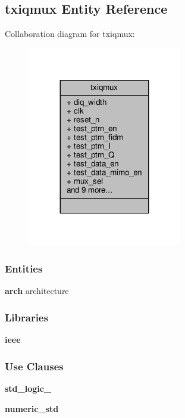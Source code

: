 \subsection{txiqmux Entity Reference}
\label{classtxiqmux}


Collaboration diagram for txiqmux\+:\nopagebreak
\begin{figure}[H]
\begin{center}
\leavevmode
\includegraphics[width=191pt]{d3/dbd/classtxiqmux__coll__graph}
\end{center}
\end{figure}
\subsubsection*{Entities}
\begin{DoxyCompactItemize}
\item 
{\bf arch} architecture
\end{DoxyCompactItemize}
\subsubsection*{Libraries}
 \begin{DoxyCompactItemize}
\item 
{\bf ieee} 
\end{DoxyCompactItemize}
\subsubsection*{Use Clauses}
 \begin{DoxyCompactItemize}
\item 
{\bf std\+\_\+logic\+\_}   
\item 
{\bf numeric\+\_\+std}   
\end{DoxyCompactItemize}
